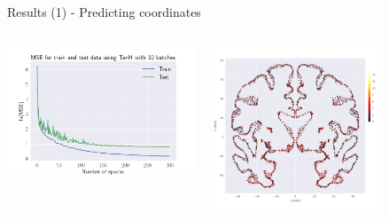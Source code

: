 \documentclass[aspectratio=169]{beamer}
\begin{document}
\begin{frame}{Results (1) - Predicting coordinates}
  \begin{columns}
    \begin{column}{0.5\textwidth}
        \includegraphics[width=\textwidth]{figures/MSE_simple_dipole_lr0.001_l1_penalty_300_50000_TanH_30_300_N_dipoles_1.png}
    \end{column}
    \begin{column}{0.5\textwidth}
        \includegraphics[width=0.7\textwidth]{figures/simple_dipole_error_position.pdf}
    \end{column}
  \end{columns}
\end{frame}
\end{document}
